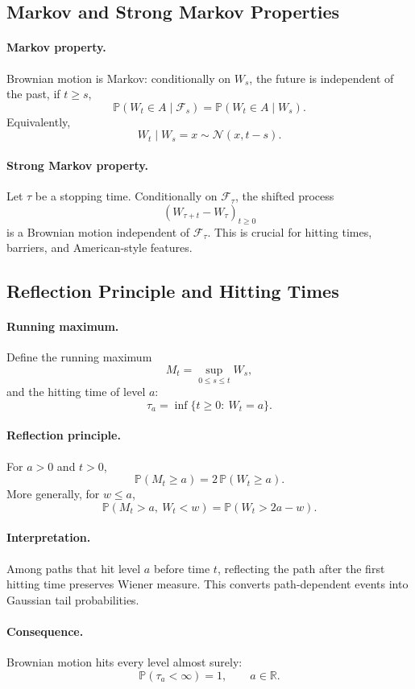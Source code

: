\documentclass[11pt]{article}
\newcommand{\R}{\mathbb{R}}
\newcommand{\Pbb}{\mathbb{P}}
\newcommand{\1}{\mathbf{1}}
\theoremstyle{plain}
\theoremstyle{definition}
\theoremstyle{remark}
\begin{document}
\subsection{Markov and Strong Markov Properties}

\paragraph{Markov property.}
Brownian motion is Markov: conditionally on $W_s$,
the future is independent of the past,  if $t \geq s$, 
\[
\Pbb(W_t\in A\mid\mathcal F_s)=\Pbb(W_t\in A\mid W_s).
\]
Equivalently,
\[
W_t\mid W_s=x \sim \mathcal N(x,t-s).
\]

\paragraph{Strong Markov property.}
Let $\tau$ be a stopping time.
Conditionally on $\mathcal F_\tau$, the shifted process
\[
(W_{\tau+t}-W_\tau)_{t\ge0}
\]
is a Brownian motion independent of $\mathcal F_\tau$.
This is crucial for hitting times, barriers, and American-style features.

\subsection{Reflection Principle and Hitting Times}

\paragraph{Running maximum.}
Define the running maximum
\[
M_t=\sup_{0\le s\le t} W_s,
\]
and the hitting time of level $a$:
\[
\tau_a=\inf\{t\ge0:\ W_t=a\}.
\]

\paragraph{Reflection principle.}
For $a>0$ and $t>0$,
\[
\Pbb(M_t\ge a)=2\,\Pbb(W_t\ge a).
\]
More generally, for $w\le a$,
\[
\Pbb(M_t>a,\ W_t<w)=\Pbb(W_t>2a-w).
\]

\paragraph{Interpretation.}
Among paths that hit level $a$ before time $t$,
reflecting the path after the first hitting time preserves Wiener measure.
This converts path-dependent events into Gaussian tail probabilities.

\paragraph{Consequence.}
Brownian motion hits every level almost surely:
\[
\Pbb(\tau_a<\infty)=1,
\qquad a\in\R.
\]
\end{document}
